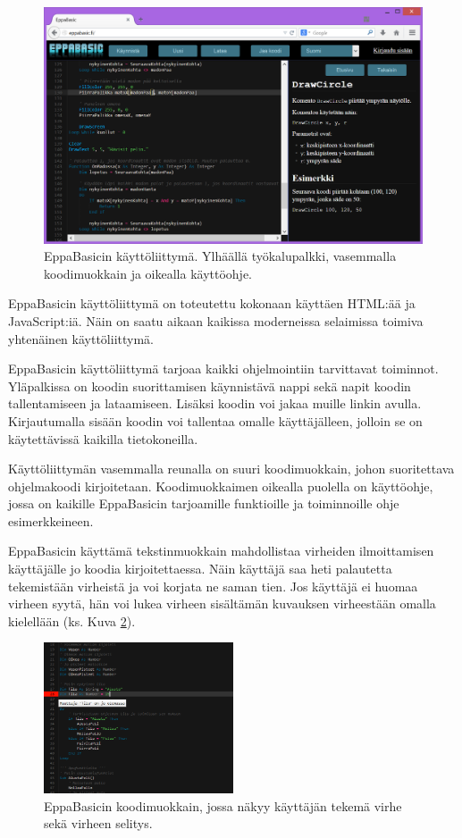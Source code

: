 \begin{figure}[h]
    \centering
    \includegraphics[width=1\textwidth]{kayttoliittyma}
    \caption{EppaBasicin käyttöliittymä. Ylhäällä työkalupalkki, vasemmalla koodimuokkain ja oikealla käyttöohje.}
    \label{img:kayttoliittyma}
\end{figure}

EppaBasicin käyttöliittymä on toteutettu
kokonaan käyttäen HTML:ää ja JavaScript:iä.
Näin on saatu aikaan kaikissa moderneissa
selaimissa toimiva yhtenäinen käyttöliittymä.

EppaBasicin käyttöliittymä tarjoaa kaikki
ohjelmointiin tarvittavat toiminnot.
Yläpalkissa on koodin suorittamisen käynnistävä
nappi sekä napit koodin tallentamiseen ja lataamiseen.
Lisäksi koodin voi jakaa muille linkin avulla.
Kirjautumalla sisään koodin voi tallentaa
omalle käyttäjälleen, jolloin se on käytettävissä
kaikilla tietokoneilla.

Käyttöliittymän vasemmalla reunalla on
suuri koodimuokkain, johon suoritettava
ohjelmakoodi kirjoitetaan.
Koodimuokkaimen oikealla puolella on
käyttöohje, jossa on kaikille
EppaBasicin tarjoamille funktioille
ja toiminnoille ohje esimerkkeineen.

EppaBasicin käyttämä tekstinmuokkain mahdollistaa
virheiden ilmoittamisen käyttäjälle jo
koodia kirjoitettaessa.
Näin käyttäjä saa heti palautetta tekemistään
virheistä ja voi korjata ne saman tien.
Jos käyttäjä ei huomaa virheen syytä,
hän voi lukea virheen sisältämän
kuvauksen virheestään omalla kielellään
(ks. Kuva \ref{img:virhe}).

\begin{figure}[h]
    \centering
    \includegraphics[width=0.5\textwidth]{virhe}
    \caption{EppaBasicin koodimuokkain, jossa näkyy käyttäjän tekemä virhe sekä virheen selitys.}
    \label{img:virhe}
\end{figure}

